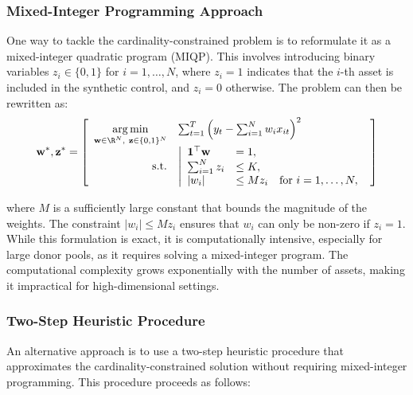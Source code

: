 \subsubsection{Mixed-Integer Programming Approach}
One way to tackle the cardinality-constrained problem is to reformulate it as a mixed-integer quadratic program (MIQP). This involves introducing binary variables $z_i \in \{0, 1\}$ for $i = 1, \dots, N$, where $z_i = 1$ indicates that the $i$-th asset is included in the synthetic control, and $z_i = 0$ otherwise. The problem can then be rewritten as:
\begin{equation*}
\mathbf{w}^*, \mathbf{z}^* 
= 
\left[
\begin{array}{rlll}
\underset{\mathbf{w} \in \R^{N},~\mathbf{z} \in \{0, 1\}^N}{\arg\min}
&
\sum_{t=1}^T \left(y_{t} - \sum_{i=1}^N w_i x_{it}\right)^2
\\
\text{s.t.}  &
\left|
\begin{array}{ll}
\mathbf{1}^\top \mathbf{w} &= 1, \\
\sum_{i=1}^N z_i &\leq K, \\
|w_i| &\leq M z_i \quad \text{for } i = 1, \dots, N,
\end{array}
\right.
\end{array}
\right]
\end{equation*}

where $M$ is a sufficiently large constant that bounds the magnitude of the weights. The constraint $|w_i| \leq M z_i$ ensures that $w_i$ can only be non-zero if $z_i = 1$. While this formulation is exact, it is computationally intensive, especially for large donor pools, as it requires solving a mixed-integer program. The computational complexity grows exponentially with the number of assets, making it impractical for high-dimensional settings.

\subsubsection{Two-Step Heuristic Procedure}
An alternative approach is to use a two-step heuristic procedure that approximates the cardinality-constrained solution without requiring mixed-integer programming. This procedure proceeds as follows:

